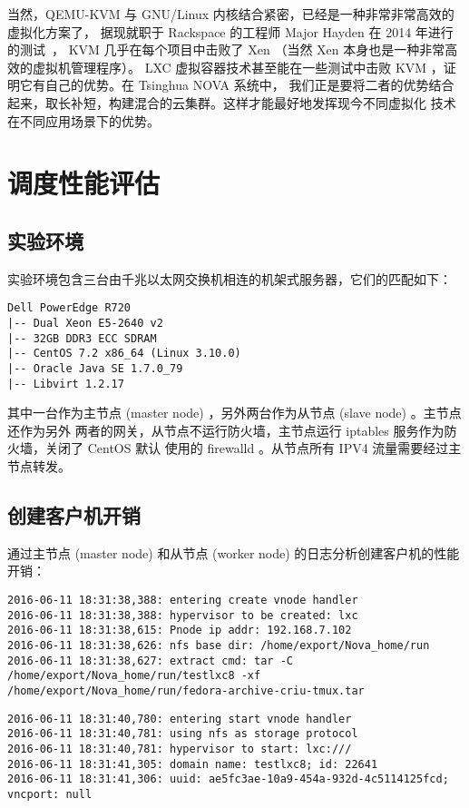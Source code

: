 当然，QEMU-KVM 与 GNU/Linux 内核结合紧密，已经是一种非常非常高效的虚拟化方案了，
据现就职于 Rackspace 的工程师 Major Hayden 在 2014 年进行的测试~\cite{kvm-vs-xen}，
KVM 几乎在每个项目中击败了 Xen （当然 Xen 本身也是一种非常高效的虚拟机管理程序）。
LXC 虚拟容器技术甚至能在一些测试中击败 KVM ，证明它有自己的优势。在 Tsinghua NOVA 系统中，
我们正是要将二者的优势结合起来，取长补短，构建混合的云集群。这样才能最好地发挥现今不同虚拟化
技术在不同应用场景下的优势。

\section{调度性能评估}

\subsection{实验环境}

实验环境包含三台由千兆以太网交换机相连的机架式服务器，它们的匹配如下：

\begin{lstlisting}
Dell PowerEdge R720
|-- Dual Xeon E5-2640 v2
|-- 32GB DDR3 ECC SDRAM
|-- CentOS 7.2 x86_64 (Linux 3.10.0)
|-- Oracle Java SE 1.7.0_79
|-- Libvirt 1.2.17
\end{lstlisting}

其中一台作为主节点 (master node) ，另外两台作为从节点 (slave node) 。主节点还作为另外
两者的网关，从节点不运行防火墙，主节点运行 iptables 服务作为防火墙，关闭了 CentOS 默认
使用的 firewalld 。从节点所有 IPV4 流量需要经过主节点转发。

\subsection{创建客户机开销}

通过主节点 (master node) 和从节点 (worker node) 的日志分析创建客户机的性能开销：

\begin{lstlisting}
2016-06-11 18:31:38,388: entering create vnode handler
2016-06-11 18:31:38,388: hypervisor to be created: lxc
2016-06-11 18:31:38,615: Pnode ip addr: 192.168.7.102
2016-06-11 18:31:38,626: nfs base dir: /home/export/Nova_home/run
2016-06-11 18:31:38,627: extract cmd: tar -C /home/export/Nova_home/run/testlxc8 -xf /home/export/Nova_home/run/fedora-archive-criu-tmux.tar
\end{lstlisting}

\begin{lstlisting}
2016-06-11 18:31:40,780: entering start vnode handler
2016-06-11 18:31:40,781: using nfs as storage protocol
2016-06-11 18:31:40,781: hypervisor to start: lxc:///
2016-06-11 18:31:41,305: domain name: testlxc8; id: 22641
2016-06-11 18:31:41,306: uuid: ae5fc3ae-10a9-454a-932d-4c5114125fcd; vncport: null
\end{lstlisting}

